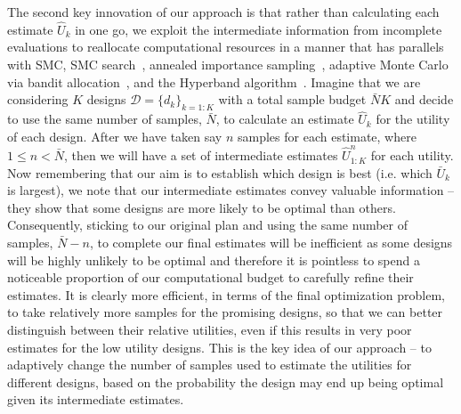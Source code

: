 The second key innovation of our approach is that rather than calculating each estimate $\hat{U}_k$ in one go, we
exploit the intermediate information from incomplete evaluations to reallocate computational
resources in a manner that has parallels with SMC, SMC search~\citep{amzal2006bayesian}, annealed
importance sampling~\citep{neal2001annealed}, adaptive Monte Carlo via bandit 
allocation~\citep{neufeld2014adaptive}, and the Hyperband algorithm~\citep{li2016hyperband}.
Imagine that we are considering $K$ designs $\mathcal{D} = \{d_k\}_{k=1:K}$ with a total sample budget $\bar{N}K$
and decide to use the same number of samples, $\bar{N}$, to calculate an estimate $\hat{U}_{k}$ for the 
utility of each design.  
After we have taken say $n$ samples
for each estimate, where $1\le n<\bar{N}$, then we will have a set of intermediate estimates $\hat{U}_{1:K}^n$ for
each utility.  Now remembering that our aim is to establish which design is best (i.e. which $\bar{U}_k$ is largest),
we note that our intermediate estimates convey valuable information -- they show that some designs are more
likely to be optimal than others.
Consequently, sticking to our original plan and using the same number of samples, $\bar{N}-n$, 
to complete our final estimates will
be inefficient as some designs will be highly unlikely to be optimal and therefore it is pointless to
spend a noticeable proportion of our computational budget to carefully refine their estimates.  It is clearly 
more efficient, in terms
of the final optimization problem, to take relatively more samples for the promising designs, so that we can better 
distinguish between their relative utilities, even if this results in very poor estimates for the low utility
designs.  This is the key idea of our approach -- to adaptively change the number of samples used to estimate
the utilities for different designs, based on the probability the design may end up being optimal given its
intermediate estimates.

